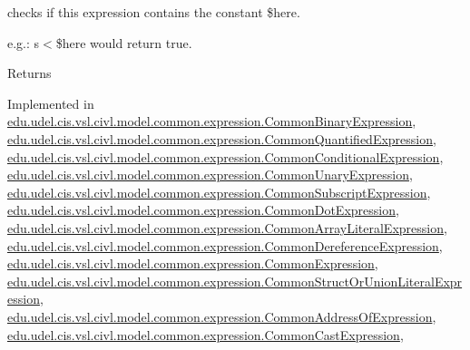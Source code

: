 checks if this expression contains the constant \$here. 

e.\+g.\+: s$<$\$here would return true.

\begin{DoxyReturn}{Returns}

\end{DoxyReturn}


Implemented in \hyperlink{classedu_1_1udel_1_1cis_1_1vsl_1_1civl_1_1model_1_1common_1_1expression_1_1CommonBinaryExpression_a148b560bd4b4e5e935ca3874357bf59c}{edu.\+udel.\+cis.\+vsl.\+civl.\+model.\+common.\+expression.\+Common\+Binary\+Expression}, \hyperlink{classedu_1_1udel_1_1cis_1_1vsl_1_1civl_1_1model_1_1common_1_1expression_1_1CommonQuantifiedExpression_ab151b7524bf639ad5b6f1bb71e073e85}{edu.\+udel.\+cis.\+vsl.\+civl.\+model.\+common.\+expression.\+Common\+Quantified\+Expression}, \hyperlink{classedu_1_1udel_1_1cis_1_1vsl_1_1civl_1_1model_1_1common_1_1expression_1_1CommonConditionalExpression_afe0c000c2b1deb9995ecc6b3f727f2b8}{edu.\+udel.\+cis.\+vsl.\+civl.\+model.\+common.\+expression.\+Common\+Conditional\+Expression}, \hyperlink{classedu_1_1udel_1_1cis_1_1vsl_1_1civl_1_1model_1_1common_1_1expression_1_1CommonUnaryExpression_af8b5dd134d7b1b840b28549b657acb7f}{edu.\+udel.\+cis.\+vsl.\+civl.\+model.\+common.\+expression.\+Common\+Unary\+Expression}, \hyperlink{classedu_1_1udel_1_1cis_1_1vsl_1_1civl_1_1model_1_1common_1_1expression_1_1CommonSubscriptExpression_ac022b0916195b94d77fbd54cfb94fcc1}{edu.\+udel.\+cis.\+vsl.\+civl.\+model.\+common.\+expression.\+Common\+Subscript\+Expression}, \hyperlink{classedu_1_1udel_1_1cis_1_1vsl_1_1civl_1_1model_1_1common_1_1expression_1_1CommonDotExpression_ae9315f2ad02dda1de9f3d2282b36bc65}{edu.\+udel.\+cis.\+vsl.\+civl.\+model.\+common.\+expression.\+Common\+Dot\+Expression}, \hyperlink{classedu_1_1udel_1_1cis_1_1vsl_1_1civl_1_1model_1_1common_1_1expression_1_1CommonArrayLiteralExpression_aae8a012f64a4dcff52aad828c0545c1d}{edu.\+udel.\+cis.\+vsl.\+civl.\+model.\+common.\+expression.\+Common\+Array\+Literal\+Expression}, \hyperlink{classedu_1_1udel_1_1cis_1_1vsl_1_1civl_1_1model_1_1common_1_1expression_1_1CommonDereferenceExpression_a6838b2bb33fbf7b903f0b762d58da359}{edu.\+udel.\+cis.\+vsl.\+civl.\+model.\+common.\+expression.\+Common\+Dereference\+Expression}, \hyperlink{classedu_1_1udel_1_1cis_1_1vsl_1_1civl_1_1model_1_1common_1_1expression_1_1CommonExpression_a9d4713d6f1bf3700af47567f13ac15ff}{edu.\+udel.\+cis.\+vsl.\+civl.\+model.\+common.\+expression.\+Common\+Expression}, \hyperlink{classedu_1_1udel_1_1cis_1_1vsl_1_1civl_1_1model_1_1common_1_1expression_1_1CommonStructOrUnionLiteralExpression_afe316de61838c6d1bfea104671faffaa}{edu.\+udel.\+cis.\+vsl.\+civl.\+model.\+common.\+expression.\+Common\+Struct\+Or\+Union\+Literal\+Expression}, \hyperlink{classedu_1_1udel_1_1cis_1_1vsl_1_1civl_1_1model_1_1common_1_1expression_1_1CommonAddressOfExpression_a85d84eb55bc5c3b0816eb54e61b93012}{edu.\+udel.\+cis.\+vsl.\+civl.\+model.\+common.\+expression.\+Common\+Address\+Of\+Expression}, \hyperlink{classedu_1_1udel_1_1cis_1_1vsl_1_1civl_1_1model_1_1common_1_1expression_1_1CommonCastExpression_ae721690269ea61b29e46d30eff40f7fb}{edu.\+udel.\+cis.\+vsl.\+civl.\+model.\+common.\+expression.\+Common\+Cast\+Expression}, 